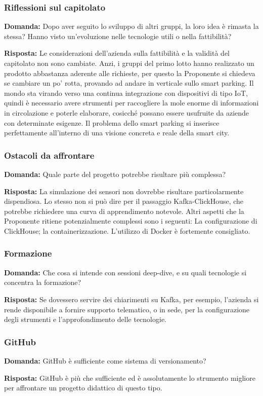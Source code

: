 \subsubsection{Riflessioni sul capitolato}
\textbf{Domanda:} Dopo aver seguito lo sviluppo di altri gruppi, la loro idea è rimasta la stessa? Hanno visto un’evoluzione nelle tecnologie utili o nella fattibilità?

\textbf{Risposta:} Le considerazioni dell’azienda sulla fattibilità e la validità del capitolato non sono cambiate. Anzi, i gruppi del primo lotto hanno realizzato un prodotto abbastanza aderente alle richieste, per questo la Proponente si chiedeva se cambiare un po' rotta, provando ad andare in verticale sullo smart parking. Il mondo sta virando verso una continua integrazione con dispositivi di tipo IoT, quindi è necessario avere strumenti per raccogliere la mole enorme di informazioni in circolazione e poterle elaborare, cosicché possano essere usufruite da aziende con determinate esigenze. Il problema dello smart parking si inserisce perfettamente all’interno di una visione concreta e reale della smart city.

\subsubsection{Ostacoli da affrontare}
\textbf{Domanda:} Quale parte del progetto potrebbe risultare più complessa?

\textbf{Risposta:} La simulazione dei sensori non dovrebbe risultare particolarmente dispendiosa. Lo stesso non si può dire per il passaggio Kafka-ClickHouse, che potrebbe richiedere una curva di apprendimento notevole. Altri aspetti che la Proponente ritiene potenzialmente complessi sono i seguenti:
La configurazione di ClickHouse;
la containerizzazione.
L’utilizzo di Docker è fortemente consigliato.

\subsubsection{Formazione}
\textbf{Domanda:} Che cosa si intende con sessioni deep-dive, e su quali tecnologie si concentra la formazione?

\textbf{Risposta:} Se dovessero servire dei chiarimenti su Kafka, per esempio, l'azienda si rende disponibile a fornire supporto telematico, o in sede, per la configurazione degli strumenti e l’approfondimento delle tecnologie.

\subsubsection{GitHub}
\textbf{Domanda:} GitHub è sufficiente come sistema di versionamento?

\textbf{Risposta:} GitHub è più che sufficiente ed è assolutamente lo strumento migliore per affrontare un progetto didattico di questo tipo.
